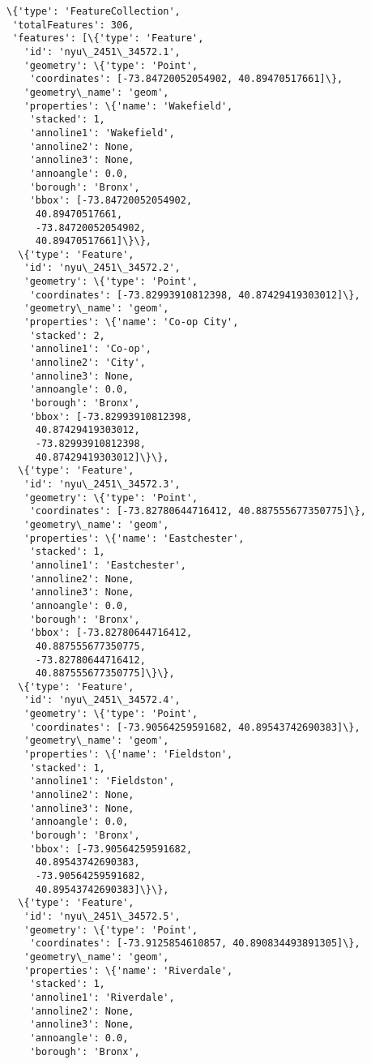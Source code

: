 \documentclass[11pt]{article}
\makeatletter
\newcommand{\boxspacing}{\kern\kvtcb@left@rule\kern\kvtcb@boxsep}
\newcommand{\prompt}[4]{
        \ttfamily\llap{{\color{#2}[#3]:\hspace{3pt}#4}}\vspace{-\baselineskip}
    }
\makeatother
\begin{document}
            \begin{tcolorbox}[breakable, size=fbox, boxrule=.5pt, pad at break*=1mm, opacityfill=0]
\prompt{Out}{outcolor}{25}{\boxspacing}
\begin{Verbatim}[commandchars=\\\{\}]
\{'type': 'FeatureCollection',
 'totalFeatures': 306,
 'features': [\{'type': 'Feature',
   'id': 'nyu\_2451\_34572.1',
   'geometry': \{'type': 'Point',
    'coordinates': [-73.84720052054902, 40.89470517661]\},
   'geometry\_name': 'geom',
   'properties': \{'name': 'Wakefield',
    'stacked': 1,
    'annoline1': 'Wakefield',
    'annoline2': None,
    'annoline3': None,
    'annoangle': 0.0,
    'borough': 'Bronx',
    'bbox': [-73.84720052054902,
     40.89470517661,
     -73.84720052054902,
     40.89470517661]\}\},
  \{'type': 'Feature',
   'id': 'nyu\_2451\_34572.2',
   'geometry': \{'type': 'Point',
    'coordinates': [-73.82993910812398, 40.87429419303012]\},
   'geometry\_name': 'geom',
   'properties': \{'name': 'Co-op City',
    'stacked': 2,
    'annoline1': 'Co-op',
    'annoline2': 'City',
    'annoline3': None,
    'annoangle': 0.0,
    'borough': 'Bronx',
    'bbox': [-73.82993910812398,
     40.87429419303012,
     -73.82993910812398,
     40.87429419303012]\}\},
  \{'type': 'Feature',
   'id': 'nyu\_2451\_34572.3',
   'geometry': \{'type': 'Point',
    'coordinates': [-73.82780644716412, 40.887555677350775]\},
   'geometry\_name': 'geom',
   'properties': \{'name': 'Eastchester',
    'stacked': 1,
    'annoline1': 'Eastchester',
    'annoline2': None,
    'annoline3': None,
    'annoangle': 0.0,
    'borough': 'Bronx',
    'bbox': [-73.82780644716412,
     40.887555677350775,
     -73.82780644716412,
     40.887555677350775]\}\},
  \{'type': 'Feature',
   'id': 'nyu\_2451\_34572.4',
   'geometry': \{'type': 'Point',
    'coordinates': [-73.90564259591682, 40.89543742690383]\},
   'geometry\_name': 'geom',
   'properties': \{'name': 'Fieldston',
    'stacked': 1,
    'annoline1': 'Fieldston',
    'annoline2': None,
    'annoline3': None,
    'annoangle': 0.0,
    'borough': 'Bronx',
    'bbox': [-73.90564259591682,
     40.89543742690383,
     -73.90564259591682,
     40.89543742690383]\}\},
  \{'type': 'Feature',
   'id': 'nyu\_2451\_34572.5',
   'geometry': \{'type': 'Point',
    'coordinates': [-73.9125854610857, 40.890834493891305]\},
   'geometry\_name': 'geom',
   'properties': \{'name': 'Riverdale',
    'stacked': 1,
    'annoline1': 'Riverdale',
    'annoline2': None,
    'annoline3': None,
    'annoangle': 0.0,
    'borough': 'Bronx',

\end{Verbatim}
\end{tcolorbox}
\end{document}
